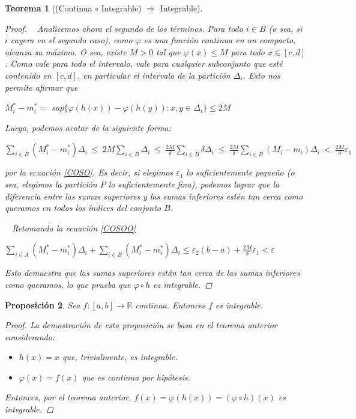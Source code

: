 \documentclass[]{article}
\newtheorem{teo}{Teorema}
\newtheorem{prop}[teo]{Proposición}
\def\R{\mathbb{R}}
\def\e{\varepsilon}
\begin{document}
\begin{teo}[(Continua $\circ$ Integrable) $\Rightarrow$ Integrable]
\begin{proof}
		~\newline
		Analicemos ahora el segundo de los términos. Para todo $i\in B$ (o sea, si $i$ cayera en el segundo caso), como $\varphi$ es una función continua en un compacto, alcanza su máximo. O sea, existe $M>0$ tal que $\varphi(x)\leq M$ para todo $x\in[c,d]$. Como vale para todo el intervalo, vale para cualquier subconjunto que esté contenido en $[c,d]$, en particular el intervalo de la partición $\Delta_i$. 
		Esto nos permite afirmar que
		\begin{center}
			$M^*_i-m^*_i = $ sup$\{\varphi(h(x)) - \varphi(h(y)):x,y\in\Delta_i\}\leq 2M$
		\end{center}
		Luego, podemos acotar de la siguiente forma:
		\begin{center}
			$\displaystyle \sum_{i\in B}(M^*_i-m^*_i)\Delta_i \ \leq\  2M\sum_{i\in B}\Delta_i \ \leq \ \frac{2M}{\delta}\sum_{i\in B}\delta\Delta_i \ \leq \ \frac{2M}{\delta}\sum_{i\in B}(M_i-m_i)\Delta_i \ < \ \frac{2M}{\delta}\e_1$
		\end{center}
		por la ecuación \eqref{COSO}. Es decir, si elegimos $\e_1$ lo suficientemente pequeño (o sea, elegimos la partición $P$ lo suficientemente fina), podemos lograr que la diferencia entre las sumas superiores y las sumas inferiores estén tan cerca como queramos en todos los índices del conjunto $B$.
		
		~\newline
		Retomando la ecuación \eqref{COSOO}
		\begin{center}
			$\displaystyle \sum_{i\in A}(M^*_i - m^*_i)\Delta_i + \sum_{i\in B}(M^*_i - m^*_i)\Delta_i \leq \e_2(b-a) + \frac{2M}{\delta}\e_1 < \e$
		\end{center}
		Esto demuestra que las sumas superiores están tan cerca de las sumas inferiores como queramos, lo que prueba que $\varphi \circ h$ es integrable.
	\end{proof}
\end{teo}

\begin{prop}
	Sea $f:[a,b]\to\R$ continua. Entonces $f$ es integrable.
	\begin{proof}
		La demostración de esta proposición se basa en el teorema anterior considerando:
		\begin{itemize}
			\item $h(x) = x$ que, trivialmente, es integrable.
			\item $\varphi(x) = f(x)$ que es continua por hipótesis.
		\end{itemize}
		Entonces, por el teorema anterior, $f(x) = \varphi(h(x)) = (\varphi \circ h)(x)$ es integrable.
	\end{proof}
\end{prop}
\end{document}
